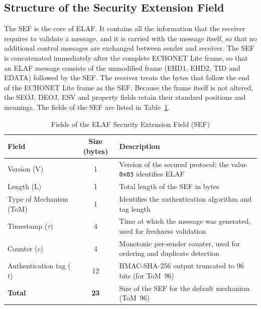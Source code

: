 \subsection{Structure of the Security Extension Field}
\label{sec:m-sef}

The SEF is the core of ELAF. It contains all the information that the receiver requires to validate a message, and it is carried with the message itself, so that no additional control messages are exchanged between sender and receiver. The SEF is concatenated immediately after the complete ECHONET Lite frame, so that an ELAF message consists of the unmodified frame (EHD1, EHD2, TID and EDATA) followed by the SEF. The receiver treats the bytes that follow the end of the ECHONET Lite frame as the SEF. Because the frame itself is not altered, the SEOJ, DEOJ, ESV and property fields retain their standard positions and meanings. The fields of the SEF are listed in Table~\ref{tab:sef}.

\begin{table}[htbp]
  \centering
  \caption{Fields of the ELAF Security Extension Field (SEF)}
  \label{tab:sef}
  \renewcommand{\arraystretch}{1.2}
  \begin{tabularx}{\textwidth}{@{}l c X@{}}
    \toprule
    \textbf{Field}         & \textbf{Size (bytes)} & \textbf{Description}                                                        \\
    \midrule
    Version (V)            & 1                     & Version of the secured protocol; the value \texttt{0x03} identifies ELAF    \\
    Length (L)             & 1                     & Total length of the SEF in bytes                                            \\
    Type of Mechanism (ToM) & 1                    & Identifies the authentication algorithm and tag length                      \\
    Timestamp ($\tau$)     & 4                     & Time at which the message was generated, used for freshness validation     \\
    Counter ($c$)          & 4                     & Monotonic per-sender counter, used for ordering and duplicate detection    \\
    Authentication tag ($t$) & 12                  & HMAC-SHA-256 output truncated to 96 bits (for ToM~96)                       \\
    \midrule
    \textbf{Total}         & \textbf{23}           & Size of the SEF for the default mechanism (ToM~96)                          \\
    \bottomrule
  \end{tabularx}
\end{table}


